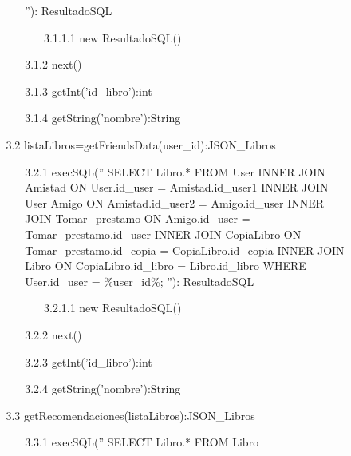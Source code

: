 ﻿\documentclass{report}
\begin{document}
\begin{enumerate}
\begin{enumerate}
\begin{enumerate}
\begin{enumerate}
                            ''): ResultadoSQL
                        \begin{enumerate}
                            \item[3.1.1.1] new ResultadoSQL()
                        \end{enumerate}
                        \item[3.1.2] next()
                        \item[3.1.3] getInt('id\_libro'):int
                        \item[3.1.4] getString('nombre'):String
                    \end{enumerate}
                    \item[3.2] listaLibros=getFriendsData(user\_id):JSON\_Libros
                    \begin{enumerate}
                        \item[3.2.1] execSQL(''
                            SELECT Libro.* 
                            FROM User 
                            INNER JOIN Amistad ON User.id\_user = Amistad.id\_user1
                            INNER JOIN User Amigo ON Amistad.id\_user2 = Amigo.id\_user
                            INNER JOIN Tomar\_prestamo ON Amigo.id\_user = Tomar\_prestamo.id\_user
                            INNER JOIN CopiaLibro ON Tomar\_prestamo.id\_copia = CopiaLibro.id\_copia
                            INNER JOIN Libro ON CopiaLibro.id\_libro = Libro.id\_libro
                            WHERE User.id\_user = \%user\_id\%;
                            ''): ResultadoSQL
                        \begin{enumerate}
                            \item[3.2.1.1] new ResultadoSQL()
                        \end{enumerate}
                        \item[3.2.2] next()
                        \item[3.2.3] getInt('id\_libro'):int
                        \item[3.2.4] getString('nombre'):String
                    \end{enumerate}
                    \item[3.3] getRecomendaciones(listaLibros):JSON\_Libros
                    \begin{enumerate}
                        \item[3.3.1] execSQL(''
                            SELECT Libro.*
                            FROM Libro

\end{enumerate}
\end{enumerate}
\end{enumerate}
\end{enumerate}
\end{document}
